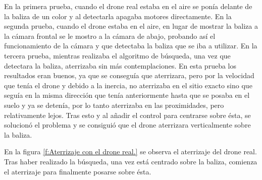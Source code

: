 \hspace{1cm} En la primera prueba, cuando el drone real estaba en el aire se pon\'ia delante de la baliza de un color y al detectarla apagaba motores directamente. En la segunda prueba, cuando el drone estaba en el aire, en lugar de mostrar la baliza a la c\'amara frontal se le mostro a la c\'amara de abajo, probando as\'i el funcionamiento de la c\'amara y que detectaba la baliza que se iba a utilizar. En la tercera prueba, mientras realizaba el algoritmo de b\'usqueda, una vez que detectara la baliza, aterrizaba sin m\'as contemplaciones. En esta prueba los resultados eran buenos, ya que se consegu\'ia que aterrizara, pero por la velocidad que ten\'ia el drone y debido a la inercia, no aterrizaba en el sitio exacto sino que segu\'ia en la misma direcci\'on que ten\'ia anteriormente hasta que se posaba en el suelo y ya se deten\'ia, por lo tanto aterrizaba en las proximidades, pero relativamente lejos. Tras esto y al añadir el control para centrarse sobre \'esta, se solucion\'o el problema y se consigui\'o que el drone aterrizara verticalmente sobre la baliza. 

En la figura \ref{f:Aterrizaje con el drone real.} se observa el aterrizaje del drone real. Tras haber realizado la b\'usqueda, una vez est\'a centrado sobre la baliza, comienza el aterrizaje para finalmente posarse sobre \'esta.

